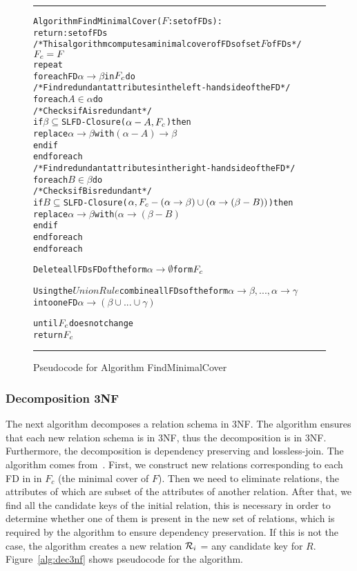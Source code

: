 \begin{figure}[htbp]
\hrule
\vspace{0.25cm}
\begin{alltt}
Algorithm FindMinimalCover(\(F\): set of FDs):
             return: set of FDs
/* This algorithm computes a minimal cover of FDs of set \(F\) of FDs */
  \(F\sb{c} = F\)
  repeat
    foreach FD \(\alpha \rightarrow \beta\) in \(F\sb{c}\) do
      /* Find redundant attributes in the left-hand side of the FD */
      foreach \(A \in \alpha\) do
        /* Checks if A is redundant */
        if \(\beta \subseteq\) SLFD-Closure(\(\alpha-A, F\sb{c}\)) then
          replace \(\alpha \rightarrow \beta\) with \((\alpha-A) \rightarrow \beta\)
        end if
      end foreach
      /* Find redundant attributes in the right-hand side of the FD */
      foreach \(B \in \beta\) do
        /* Checks if B is redundant */
        if \(B \subseteq\) SLFD-Closure(\(\alpha, F\sb{c}-(\alpha \rightarrow \beta) \cup (\alpha \rightarrow (\beta - B))\)) then
          replace \(\alpha \rightarrow \beta\) with \((\alpha \rightarrow (\beta-B)\)
        end if
      end foreach
    end foreach
    
    Delete all FDs FD of the form \(\alpha \rightarrow \emptyset\) form \(F\sb{c}\)
      
    Using the \(Union Rule\) combine all FDs of the form \(\alpha \rightarrow \beta,...,\alpha \rightarrow \gamma\)
      into one FD \(\alpha \rightarrow (\beta \cup ... \cup \gamma)\)
      
  until \(F\sb{c}\) does not change
  return \(F\sb{c}\)
\end{alltt}
\caption{Pseudocode for Algorithm FindMinimalCover}\label{alg:mincov}
\hrule
\end{figure}

\subsubsection{Decomposition 3NF}
The next algorithm decomposes a relation schema in 3NF. The algorithm
ensures that each new relation schema is in 3NF, thus the decomposition is in 3NF. 
Furthermore, the decomposition is dependency preserving and lossless-join. 
The algorithm comes from~\cite[Section 6.8]{bdb2}. 
First, we construct new relations corresponding to each FD in in $F_{c}$ (the minimal cover of $F$). 
Then we need to eliminate relations, the attributes of
which are subset of the attributes of another relation. 
After that, we find all the candidate keys of
the initial relation, this is necessary in order to determine  whether one of them is present
in the new set of relations, which is required by the algorithm to ensure
dependency preservation. If this is not the case, the algorithm creates
a new relation \(\mathcal{R}\sb{i}\) = any candidate key for \(R\).
Figure~\ref{alg:dec3nf} shows pseudocode for the algorithm.

